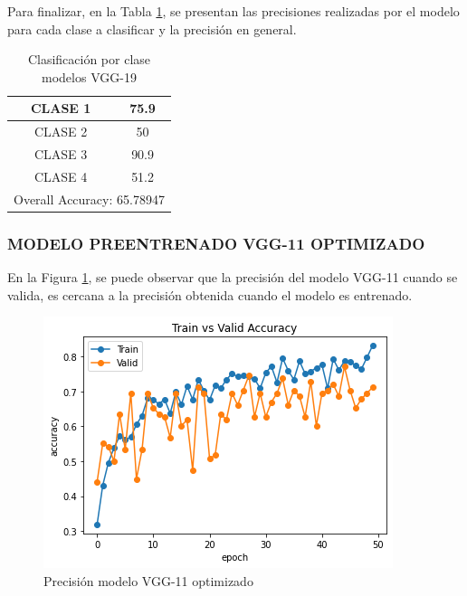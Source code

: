 	Para finalizar, en la Tabla \ref{tab:VGG19optclases}, se presentan las precisiones realizadas por el modelo para cada clase a clasificar y la precisión en general.
		\begin{table}[htbp]
			\centering
			\begin{tabular}{|c|c|}
				\hline
				CLASE 1 & 75.9 \bigstrut\\
				\hline
				CLASE 2 & 50 \bigstrut\\
				\hline
				CLASE 3 & 90.9 \bigstrut\\
				\hline
				CLASE 4 & 51.2 \bigstrut\\
				\hline
				\multicolumn{2}{|c|}{Overall Accuracy: 65.78947} \bigstrut\\
				\hline
			\end{tabular}%
			\caption{Clasificación por clase modelos VGG-19}
			\label{tab:VGG19optclases}%
		\end{table}%

\newpage	
	\subsubsection{\MakeUppercase{Modelo preentrenado VGG-11 optimizado}}
	En la Figura \ref{fig:preci_vgg11_OPT}, se puede observar que la precisión del modelo VGG-11 cuando se valida, es cercana a la precisión obtenida cuando el modelo es entrenado.
	
		\begin{figure}[ht]
			\centering
			\includegraphics[scale=0.6]{Figs/508.png}
			\caption{Precisión modelo VGG-11 optimizado}
			\label{fig:preci_vgg11_OPT}
		\end{figure}
	
